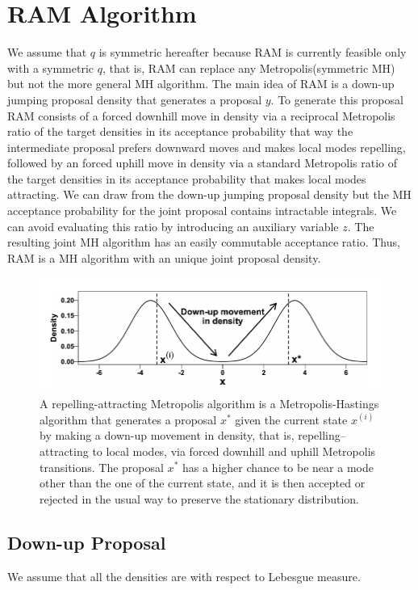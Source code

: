\documentclass{article}
\begin{document}
\section{RAM Algorithm}
We assume that $q$ is symmetric hereafter because RAM is currently feasible only with a symmetric $q$, that is, RAM can replace any Metropolis(symmetric MH) but not the more general MH algorithm. The main idea of RAM is a down-up jumping proposal density that generates a proposal $y$. To generate this proposal RAM consists of a forced downhill move in density via a reciprocal Metropolis ratio of the target densities in its acceptance probability that way the intermediate proposal prefers downward moves and makes local modes repelling, followed by an forced uphill move in density via a standard Metropolis ratio of the target densities in its acceptance probability that makes local modes attracting. We can draw from the down-up jumping proposal density but the MH acceptance probability for the joint proposal contains intractable integrals. We can avoid evaluating this ratio by introducing an auxiliary variable $z$. The resulting joint MH algorithm has an easily commutable acceptance ratio. Thus, RAM is a MH algorithm with an unique joint proposal density.
\begin{figure}[ht]
    \centering
    \includegraphics[width=\textwidth]{down-up.png}
    \caption{A repelling-attracting Metropolis algorithm is a Metropolis-Hastings algorithm that generates a proposal $x^{*}$ given the current state $x^{(i)}$ by making a down-up movement in density, that is, repelling–attracting to local modes, via forced downhill and uphill Metropolis transitions. The proposal $x^{*}$ has a higher chance to be near a mode other than the one of the current state, and it is then accepted or rejected in the usual way to preserve the stationary distribution.}
    \label{fig:downup}
\end{figure}
\subsection{Down-up Proposal}
We assume that all the densities are with respect to Lebesgue measure. 
\end{document}
